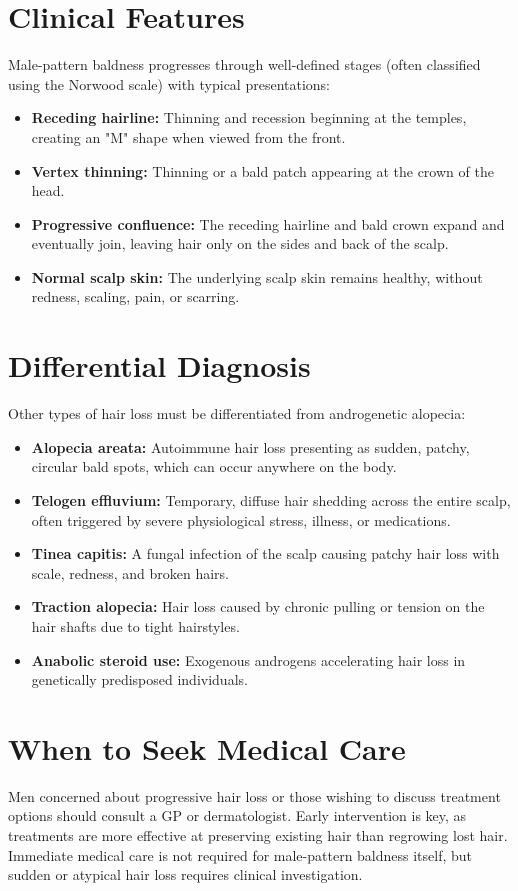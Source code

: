 \section*{Clinical Features}
Male-pattern baldness progresses through well-defined stages (often classified using the Norwood scale) with typical presentations:

\begin{itemize}
    \item \textbf{Receding hairline:} Thinning and recession beginning at the temples, creating an "M" shape when viewed from the front.
    \item \textbf{Vertex thinning:} Thinning or a bald patch appearing at the crown of the head.
    \item \textbf{Progressive confluence:} The receding hairline and bald crown expand and eventually join, leaving hair only on the sides and back of the scalp.
    \item \textbf{Normal scalp skin:} The underlying scalp skin remains healthy, without redness, scaling, pain, or scarring.
\end{itemize}

\section*{Differential Diagnosis}
Other types of hair loss must be differentiated from androgenetic alopecia:

\begin{itemize}
    \item \textbf{Alopecia areata:} Autoimmune hair loss presenting as sudden, patchy, circular bald spots, which can occur anywhere on the body.
    \item \textbf{Telogen effluvium:} Temporary, diffuse hair shedding across the entire scalp, often triggered by severe physiological stress, illness, or medications.
    \item \textbf{Tinea capitis:} A fungal infection of the scalp causing patchy hair loss with scale, redness, and broken hairs.
    \item \textbf{Traction alopecia:} Hair loss caused by chronic pulling or tension on the hair shafts due to tight hairstyles.
    \item \textbf{Anabolic steroid use:} Exogenous androgens accelerating hair loss in genetically predisposed individuals.
\end{itemize}

\section*{When to Seek Medical Care}
Men concerned about progressive hair loss or those wishing to discuss treatment options should consult a GP or dermatologist. Early intervention is key, as treatments are more effective at preserving existing hair than regrowing lost hair. Immediate medical care is not required for male-pattern baldness itself, but sudden or atypical hair loss requires clinical investigation.

